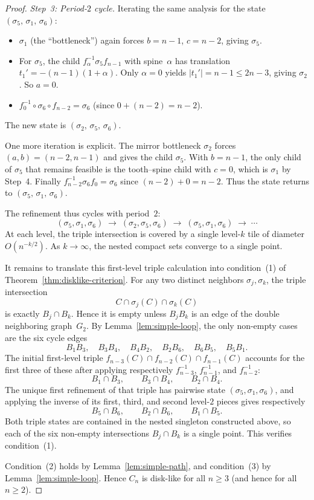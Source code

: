 \documentclass{amsart}
\theoremstyle{definition}
\theoremstyle{remark}
\begin{document}
\begin{proof}
\emph{Step~3: Period-$2$ cycle.}
Iterating the same analysis for the state
$(\sigma_5,\, \sigma_1,\, \sigma_6)$:
\begin{itemize}
\item $\sigma_1$ (the ``bottleneck'') again forces $b = n{-}1$,
  $c = n{-}2$, giving $\sigma_5$.
\item For $\sigma_5$, the child $f_\alpha^{-1} \sigma_5 f_{n-1}$
  with spine~$\alpha$ has translation
  $t_1' = -(n{-}1)(1{+}\alpha)$.  Only $\alpha = 0$ yields
  $|t_1'| = n{-}1 \le 2n{-}3$, giving $\sigma_2$.  So $a = 0$.
\item $f_0^{-1} \circ \sigma_6 \circ f_{n-2} = \sigma_6$ (since
  $0 + (n{-}2) = n{-}2$).
\end{itemize}
The new state is $(\sigma_2,\, \sigma_5,\, \sigma_6)$.

One more iteration is explicit.  The mirror bottleneck $\sigma_2$
forces $(a,b)=(n{-}2,n{-}1)$ and gives the child $\sigma_5$.
With $b=n{-}1$, the only child of $\sigma_5$ that remains feasible
is the tooth--spine child with $c=0$, which is $\sigma_1$ by
Step~4.  Finally $f_{n-2}^{-1}\sigma_6 f_0=\sigma_6$ since
$(n{-}2)+0=n{-}2$.  Thus the state returns to
$(\sigma_5,\, \sigma_1,\, \sigma_6)$.

The refinement thus cycles with period~$2$:
\[
  (\sigma_5, \sigma_1, \sigma_6)
  \;\longrightarrow\;
  (\sigma_2, \sigma_5, \sigma_6)
  \;\longrightarrow\;
  (\sigma_5, \sigma_1, \sigma_6)
  \;\longrightarrow\; \cdots
\]
At each level, the triple intersection is covered by a single
level-$k$ tile of diameter $O(n^{-k/2})$.  As $k \to \infty$,
the nested compact sets converge to a single point.

It remains to translate this first-level triple calculation into
condition~\textup{(1)} of Theorem~\ref{thm:disklike-criterion}.
For any two distinct neighbors $\sigma_j,\sigma_k$, the triple
intersection
\[
  C \cap \sigma_j(C) \cap \sigma_k(C)
\]
is exactly $B_j \cap B_k$.  Hence it is empty unless $B_jB_k$ is an
edge of the double neighboring graph~$G_2$.  By
Lemma~\ref{lem:simple-loop}, the only non-empty cases are the six
cycle edges
\[
  B_1B_3,\quad B_3B_4,\quad B_4B_2,\quad
  B_2B_6,\quad B_6B_5,\quad B_5B_1.
\]
The initial first-level triple
$f_{n-3}(C)\cap f_{n-2}(C)\cap f_{n-1}(C)$ accounts for the first
three of these after applying respectively
$f_{n-3}^{-1}$, $f_{n-1}^{-1}$, and $f_{n-2}^{-1}$:
\[
  B_1\cap B_3,\qquad B_3\cap B_4,\qquad B_2\cap B_4 .
\]
The unique first refinement of that triple has pairwise state
$(\sigma_5,\sigma_1,\sigma_6)$, and applying the inverse of its
first, third, and second level-$2$ pieces gives respectively
\[
  B_5\cap B_6,\qquad B_2\cap B_6,\qquad B_1\cap B_5 .
\]
Both triple states are contained in the nested singleton constructed
above, so each of the six non-empty intersections $B_j\cap B_k$ is a
single point.  This verifies condition~\textup{(1)}.

Condition~(2) holds by
Lemma~\ref{lem:simple-path}, and condition~(3) by
Lemma~\ref{lem:simple-loop}.  Hence $C_n$ is disk-like for all
$n \ge 3$ (and hence for all $n \ge 2$).
\end{proof}
\end{document}
